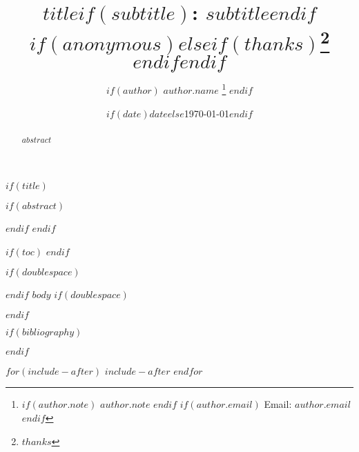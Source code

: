 \documentclass[$if(fontsize)$$fontsize$,$endif$$if(lang)$$babel-lang$,$endif$$if(papersize)$$papersize$,$endif$$for(classoption)$$classoption$$sep$,$endfor$]{article}
\title{$title$$if(subtitle)$: $subtitle$$endif$ $if(anonymous)$$else$$if(thanks)$\thanks{$thanks$} $endif$$endif$ }
\author{
$if(author)$
$author.name$
\footnote{
$if(author.note)$
$author.note$
$endif$
$if(author.email)$
Email: $author.email$
$endif$
}
$endif$
}
\date{$if(date)$$date$$else$\today$endif$}
\begin{document}
$if(title)$
\baselineskip=18pt
\maketitle
$if(abstract)$
\begin{singlespacing}
\begin{abstract}
\small
$abstract$
\end{abstract}
\end{singlespacing}
$endif$
$endif$
\thispagestyle{empty}

$if(toc)$
\newpage
\thispagestyle{empty}
{
  \hypersetup{linkcolor=black}
  \setcounter{tocdepth}{$toc-depth$}
  \tableofcontents
}
$endif$

\newpage
$if(doublespace)$
\begin{doublespacing}
$endif$
$body$
$if(doublespace)$
\end{doublespacing}
$endif$

\newpage
\singlespacing
$if(bibliography)$


$endif$

$for(include-after)$
$include-after$
$endfor$
\end{document}
